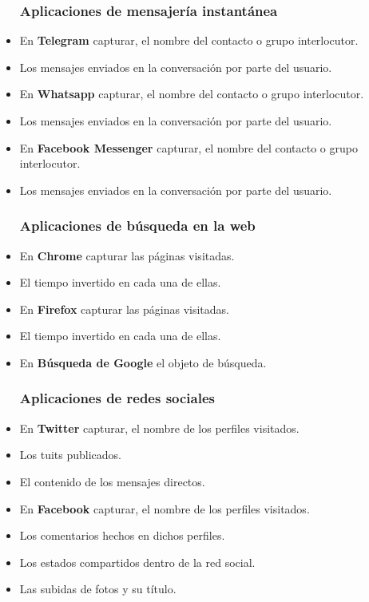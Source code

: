 \documentclass[12pt,a4paper,oneside]{book} %
\begin{document}
\begin{itemize}
\subsubsection{Aplicaciones de mensajería instantánea}
  \item En \textbf{Telegram} capturar, el nombre del contacto o grupo interlocutor. 
  \item Los mensajes enviados en la conversación por parte del usuario. 
  \item En \textbf{Whatsapp} capturar, el nombre del contacto o grupo interlocutor. 
  \item Los mensajes enviados en la conversación por parte del usuario. 
  \item En \textbf{Facebook Messenger} capturar, el nombre del contacto o grupo interlocutor. 
  \item Los mensajes enviados en la conversación por parte del usuario. 
\subsubsection{Aplicaciones de búsqueda en la web}
  \item En \textbf{Chrome} capturar las páginas visitadas. 
  \item El tiempo invertido en cada una de ellas. 
  \item En \textbf{Firefox} capturar las páginas visitadas. 
  \item El tiempo invertido en cada una de ellas. 
  \item En \textbf{Búsqueda de Google} el objeto de búsqueda. 
\subsubsection{Aplicaciones de redes sociales}
  \item En \textbf{Twitter} capturar, el nombre de los perfiles visitados. 
  \item Los tuits publicados. 
  \item El contenido de los mensajes directos. 
  \item En \textbf{Facebook} capturar, el nombre de los perfiles visitados. 
  \item Los comentarios hechos en dichos perfiles. 
  \item Los estados compartidos dentro de la red social. 
  \item Las subidas de fotos y su título. 
\end{itemize}
\end{document}
